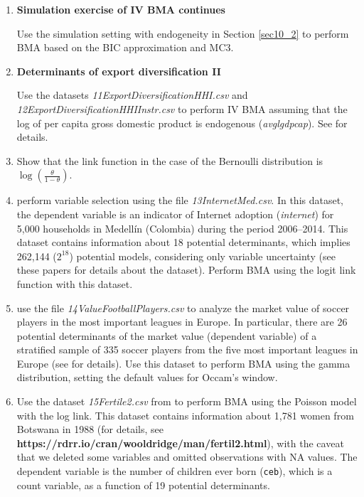 \begin{enumerate}
\item \textbf{Simulation exercise of IV BMA continues}

Use the simulation setting with endogeneity in Section \ref{sec10_2} to perform BMA based on the BIC approximation and MC3.

\item \textbf{Determinants of export diversification II}

Use the datasets \textit{11ExportDiversificationHHI.csv} and \textit{12ExportDiversificationHHIInstr.csv} to perform IV BMA assuming that the log of per capita gross domestic product is endogenous (\textit{avglgdpcap}). See \cite{Jetter2015} for details.

\item Show that the link function in the case of the Bernoulli distribution is $\log\left(\frac{\theta}{1-\theta}\right)$.

\item \cite{ramirez2020dynamic, ramirez2021specification} perform variable selection using the file \textit{13InternetMed.csv}. In this dataset, the dependent variable is an indicator of Internet adoption (\textit{internet}) for 5,000 households in Medell\'in (Colombia) during the period 2006--2014. This dataset contains information about 18 potential determinants, which implies 262,144 ($2^{18}$) potential models, considering only variable uncertainty (see these papers for details about the dataset). Perform BMA using the logit link function with this dataset.  

\item \cite{Serna2018} use the file \textit{14ValueFootballPlayers.csv} to analyze the market value of soccer players in the most important leagues in Europe. In particular, there are 26 potential determinants of the market value (dependent variable) of a stratified sample of 335 soccer players from the five most important leagues in Europe (see \cite{Serna2018} for details). Use this dataset to perform BMA using the gamma distribution, setting the default values for Occam's window.  

\item Use the dataset \textit{15Fertile2.csv} from \cite[p.~547]{Wooldridge2012} to perform BMA using the Poisson model with the log link. This dataset contains information about 1,781 women from Botswana in 1988 (for details, see \textbf{https://rdrr.io/cran/wooldridge/man/fertil2.html}), with the caveat that we deleted some variables and omitted observations with NA values. The dependent variable is the number of children ever born (\texttt{ceb}), which is a count variable, as a function of 19 potential determinants.


\end{enumerate}
